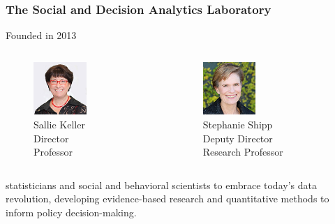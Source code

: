 \documentclass[compress]{beamer}
\begin{document}
	\begin{frame}[Basic2] \frametitle{The Social and Decision Analytics Laboratory}
		Founded in 2013
		\vspace{3mm}

		\begin{columns}
			\begin{column}{0.5\textwidth}
				\begin{figure}
					\centering
					\includegraphics[width=2cm]{../figures/keller-sallie-140-w}
					\caption{Sallie Keller\\Director\\Professor}
					\label{fig:keller-sallie-140-w}
				\end{figure}
			\end{column}
			\begin{column}{0.5\textwidth}  %
				\begin{figure}
					\centering
					\includegraphics[width=2cm]{../figures/shipp-stephanie-140-w}
					\begin{center}
						\caption{Stephanie Shipp\\Deputy Director\\Research Professor}
					\end{center}
					\label{fig:shipp-stephanie-140-w}
				\end{figure}
			\end{column}
		\end{columns}

		\begin{displayquote}
		statisticians and social and behavioral scientists to embrace today’s data revolution, developing evidence-based research and quantitative methods to inform policy decision-making.
		\end{displayquote}
	\end{frame}
\end{document}
